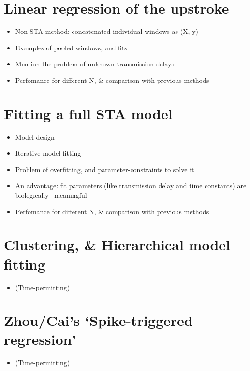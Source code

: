 \documentclass[a4paper, oneside, 11pt]{memoir}
\begin{document}
\section{Linear regression of the upstroke}

\begin{itemize}
    \item Non-STA method: concatenated individual windows as (X, y)
    \item Examples of pooled windows, and fits
    \item Mention the problem of unknown transmission delays
    \item Perfomance for different N, \& comparison with previous methods
\end{itemize}


\section{Fitting a full STA model}

\begin{itemize}
    \item Model design
    \item Iterative model fitting
    \item Problem of overfitting, and parameter-constraints to solve it
    \item An advantage: fit parameters (like transmission delay and time constants) are biologically ~meaningful
    \item Perfomance for different N, \& comparison with previous methods
\end{itemize}



\section{Clustering, \& Hierarchical model fitting}

\begin{itemize}
    \item (Time-permitting)
\end{itemize}


\section{Zhou/Cai's `Spike-triggered regression'}

\begin{itemize}
    \item (Time-permitting)
\end{itemize}
\end{document}
